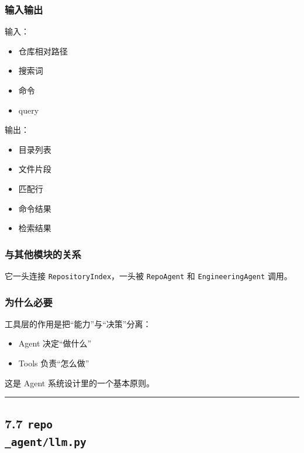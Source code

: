 \documentclass[UTF8,12pt,openany]{ctexbook}
\begin{document}
\subsubsection{输入输出}

输入：\par

\begin{itemize}
\item 仓库相对路径
\item 搜索词
\item 命令
\item query
\end{itemize}

输出：\par

\begin{itemize}
\item 目录列表
\item 文件片段
\item 匹配行
\item 命令结果
\item 检索结果
\end{itemize}

\subsubsection{与其他模块的关系}

它一头连接 \texttt{RepositoryIndex}，一头被 \texttt{RepoAgent} 和 \texttt{EngineeringAgent} 调用。\par

\subsubsection{为什么必要}

工具层的作用是把“能力”与“决策”分离：\par

\begin{itemize}
\item Agent 决定“做什么”
\item Tools 负责“怎么做”
\end{itemize}

这是 Agent 系统设计里的一个基本原则。\par

\hrule

\subsection{7.7 \texttt{repo\\_agent/llm.py}}
\end{document}

